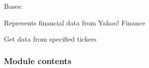 \documentclass[letterpaper,10pt,english]{sphinxmanual}
\begin{document}
\begin{fulllineitems}
\label{\detokenize{dalio.external:dalio.external.web.YahooDR}}
Bases: 

Represents financial data from Yahoo! Finance

\begin{fulllineitems}
\label{\detokenize{dalio.external:dalio.external.web.YahooDR.request}}
Get data from specified tickers

\end{fulllineitems}


\end{fulllineitems}



\subsubsection{Module contents}
\label{\detokenize{dalio.external:module-dalio.external}}\label{\detokenize{dalio.external:module-contents}}
\end{document}
